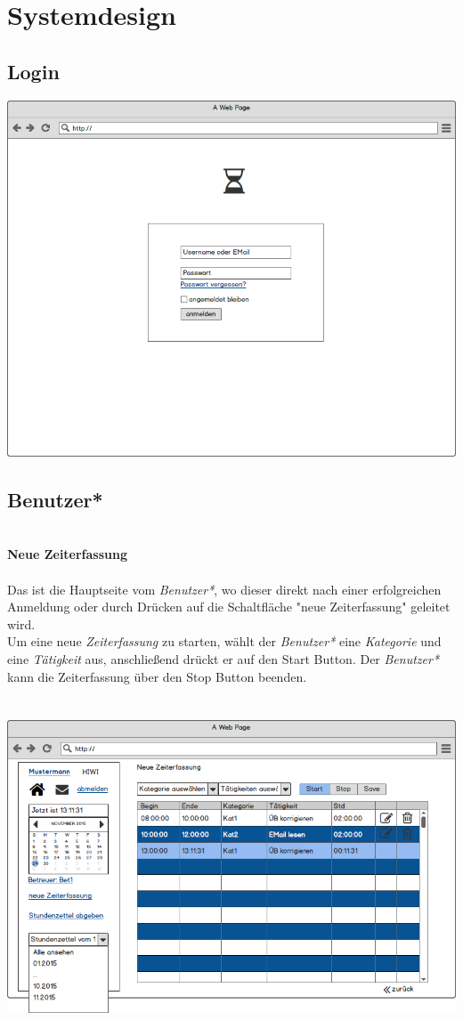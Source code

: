 \section{Systemdesign}

\subsection{Login}
\includegraphics[width=\linewidth]{UI/Login/Login.png}

\newpage
\subsection{Benutzer*}

\textbf{\\Neue Zeiterfassung}\\
\\
Das ist die Hauptseite vom \emph{Benutzer*}, wo dieser direkt nach einer erfolgreichen Anmeldung oder durch Drücken auf die Schaltfläche "neue Zeiterfassung" geleitet wird. \\
Um eine neue \emph{Zeiterfassung} zu starten, wählt der \emph{Benutzer*} eine \emph{Kategorie} und eine \emph{Tätigkeit} aus, anschließend drückt er auf den Start Button. Der \emph{Benutzer*} kann die Zeiterfassung über den Stop Button beenden.\\
\\
\\
\includegraphics[width=\linewidth]{UI/Benutzer/Zeiterfassung.png}


